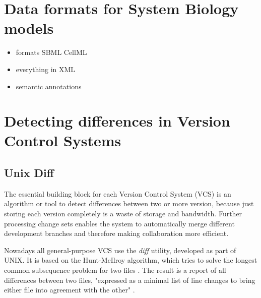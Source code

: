 \section{Data formats for System Biology models}
	\label{sec:background:formats}
	\begin{itemize}
		\item formats
		\subitem SBML
		\subitem CellML
		\subitem \sedml
		\item everything in XML
		\item semantic annotations
	\end{itemize}

\section{Detecting differences in Version Control Systems}
	\label{sec:background:diff}
	
	\subsection{Unix Diff}
	\label{sec:background:diff:unix-diff}
	The essential building block for each Version Control System (VCS) is an algorithm or tool to detect differences between two or more version, because just storing each version completely is a waste of storage and bandwidth. Further processing change sets enables the system to automatically merge different development branches and therefore making collaboration more efficient.
	
	Nowadays all general-purpose VCS use the \emph{diff} utility, developed as part of UNIX. It is based on the Hunt-McIlroy algorithm, which tries to solve the longest common subsequence problem for two files \citep{Hunt1976}.
	The result is a report of all differences between two files, "expressed as a minimal list of line changes to bring either file into agreement with the other" \citep{Hunt1976}.
	
	\begin{comment}
	\begin{itemize}
		\item Based on solving the longest common subsequence problem
		\item "The program diff reports differences between two files, expressed as a minimal list of line changes to bring either file into agreement with the other" \citep{Hunt1976}
		\item "The central algorithm of diff solves the ‘longest common subsequence problem’ to find the lines that do not change between files" \citep{Hunt1976}
	\end{itemize}
	\end{comment}
	
